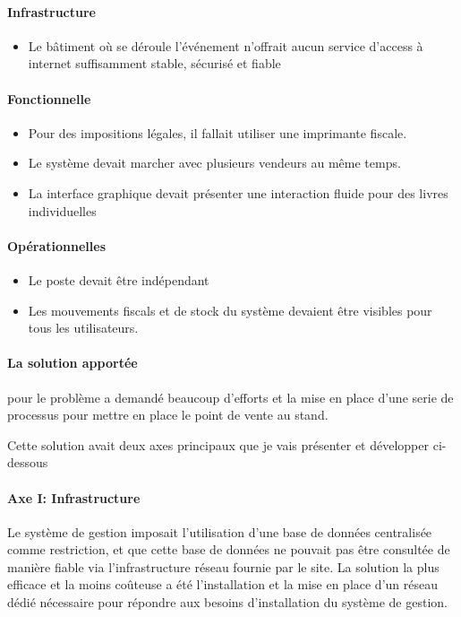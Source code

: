 \documentclass{resume} %
\begin{document}
		\paragraph{Infrastructure}
		\begin {itemize} 
			\item Le bâtiment o\`u se déroule l'événement n'offrait aucun service d'access \`a internet suffisamment stable, sécurisé et fiable
		\end {itemize}
		\paragraph{Fonctionnelle}
		\begin {itemize} 
			\item Pour des impositions légales, il fallait utiliser une imprimante fiscale.
			\item Le système devait marcher avec plusieurs vendeurs au même temps.
			\item La interface graphique devait présenter une interaction fluide pour des livres individuelles 
		\end {itemize}
		\paragraph{Opérationnelles}
		\begin {itemize} 
			\item Le poste devait être indépendant 
			\item Les mouvements fiscals et de stock du système devaient être visibles pour tous les utilisateurs.
		\end {itemize}		
		
		
		
	   \paragraph{La solution apportée} pour le problème a demandé beaucoup d'efforts et la mise en place d'une serie de  processus  pour mettre en place le point de vente au stand.
	   
	       Cette solution avait deux axes principaux que je vais présenter et développer ci-dessous
	   
	  	        
		\paragraph{Axe I: Infrastructure}
			Le système de gestion imposait l'utilisation d'une base de données centralisée comme restriction, et que cette base de données ne pouvait pas être consultée de manière fiable via l'infrastructure réseau fournie par le site.
La solution la plus efficace et la moins coûteuse a été  l'installation et la mise en place d'un réseau dédié nécessaire pour répondre aux besoins d'installation du système de gestion.
\end{document}

